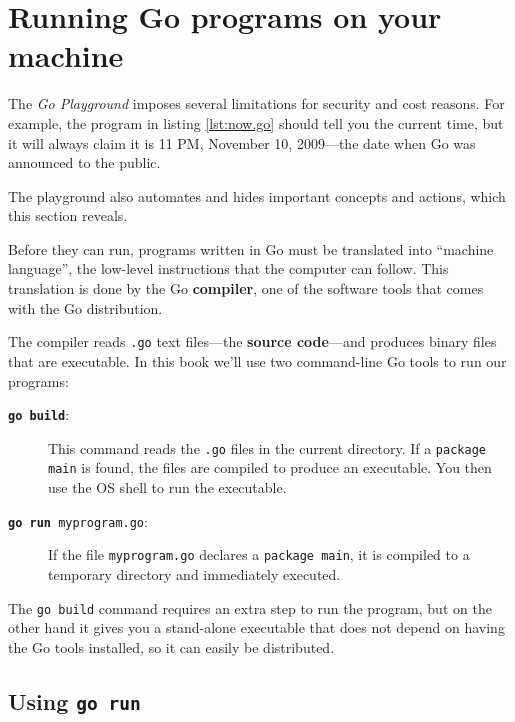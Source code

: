 \section{Running Go programs on your machine}

The {\it Go Playground} imposes several limitations for security and cost
reasons. For example, the program in listing \ref{lst:now.go} should tell
you the current time, but it will always claim it is 11 PM, November 10,
2009---the date when Go was announced to the public. 



The playground also automates and hides important concepts and actions, which
this section reveals.



Before they can run, programs written in Go must be translated into ``machine
language'', the low-level instructions that the computer can follow. This
translation is done by the Go {\bf compiler}, one of the software tools that
comes with the Go distribution.

The compiler reads {\tt .go} text files---the {\bf source code}---and produces
binary files that are executable. In this book we'll use two command-line Go
tools to run our programs:

\begin{description}

\item[\textbf{\texttt{go build}}:] This command reads the {\tt .go} files in
the current directory. If a {\tt package main} is found, the files are compiled
to produce an executable. You then use the OS shell to run the executable.

\item[\textbf{\texttt{go run }}{\tt myprogram.go}:] If the file {\tt myprogram.go}
declares a {\tt package main}, it is compiled to a temporary directory and
immediately executed.

\end{description}

The {\tt go build} command requires an extra step to run the program, but on
the other hand it gives you a stand-alone executable that does not depend
on having the Go tools installed, so it can easily be distributed.

\subsection{Using \tt{go run}}


